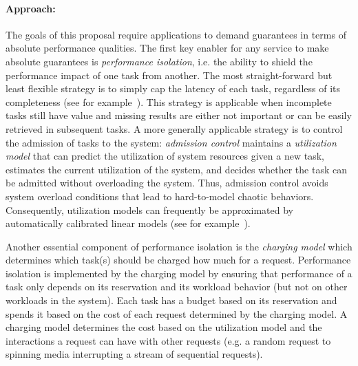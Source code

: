 \paragraph{Approach:} The goals of this proposal require applications
to demand guarantees in terms of absolute performance qualities.
The first key enabler for any service to make absolute guarantees
is \emph{performance isolation}, i.e. the ability to shield the
performance impact of one task from another. The most straight-forward
but least flexible strategy is to simply cap the latency of each
task, regardless of its completeness (see for
example~\cite{decandia:sosp07}). This strategy is applicable when
incomplete tasks still have value and missing results are either
not important or can be easily retrieved in subsequent tasks. A
more generally applicable strategy is to control the admission of
tasks to the system: \emph{admission control} maintains a
\emph{utilization model} that can predict the utilization of system
resources given a new task, estimates the current utilization of
the system, and decides whether the task can be admitted without
overloading the system. Thus, admission control avoids system
overload conditions that lead to hard-to-model chaotic behaviors.
Consequently, utilization models can frequently be approximated by
automatically calibrated linear models (see for
example~\cite{skourtis:hpdc12}).

Another essential component of performance isolation is the
\emph{charging model} which determines which task(s) should be
charged how much for a request. Performance isolation is implemented
by the charging model by ensuring that performance of a task only
depends on its reservation and its workload behavior (but not on
other workloads in the system). Each task has a budget based on its
reservation and spends it based on the cost of each request determined
by the charging model. A charging model determines the cost based
on the utilization model and the interactions a request can have
with other requests (e.g. a random request to spinning media
interrupting a stream of sequential requests).

